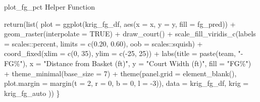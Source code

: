 \documentclass[
  9pt,
  ignorenonframetext,
  aspectratio=169]{beamer}
\newenvironment{Shaded}{\begin{snugshade}}{\end{snugshade}}
\newcommand{\AttributeTok}[1]{\textcolor[rgb]{0.00,0.34,0.68}{#1}}
\newcommand{\ConstantTok}[1]{\textcolor[rgb]{0.67,0.33,0.00}{#1}}
\newcommand{\DecValTok}[1]{\textcolor[rgb]{0.69,0.50,0.00}{#1}}
\newcommand{\FloatTok}[1]{\textcolor[rgb]{0.69,0.50,0.00}{#1}}
\newcommand{\FunctionTok}[1]{\textcolor[rgb]{0.39,0.29,0.61}{#1}}
\newcommand{\NormalTok}[1]{\textcolor[rgb]{0.12,0.11,0.11}{#1}}
\newcommand{\SpecialCharTok}[1]{\textcolor[rgb]{0.24,0.68,0.91}{#1}}
\newcommand{\StringTok}[1]{\textcolor[rgb]{0.75,0.01,0.01}{#1}}
\begin{document}
\begin{frame}[fragile]{plot\_fg\_pct Helper Function}
\begin{Shaded}
\begin{Highlighting}[]
  \FunctionTok{return}\NormalTok{(}\FunctionTok{list}\NormalTok{(}
    \AttributeTok{plot =} \FunctionTok{ggplot}\NormalTok{(krig\_fg\_df, }\FunctionTok{aes}\NormalTok{(}\AttributeTok{x =}\NormalTok{ x, }\AttributeTok{y =}\NormalTok{ y, }\AttributeTok{fill =}\NormalTok{ fg\_pred)) }\SpecialCharTok{+}
      \FunctionTok{geom\_raster}\NormalTok{(}\AttributeTok{interpolate =} \ConstantTok{TRUE}\NormalTok{) }\SpecialCharTok{+}
      \FunctionTok{draw\_court}\NormalTok{() }\SpecialCharTok{+}
      \FunctionTok{scale\_fill\_viridis\_c}\NormalTok{(}\AttributeTok{labels =}\NormalTok{ scales}\SpecialCharTok{::}\NormalTok{percent,}
                           \AttributeTok{limits =} \FunctionTok{c}\NormalTok{(}\FloatTok{0.20}\NormalTok{, }\FloatTok{0.60}\NormalTok{),}
                           \AttributeTok{oob =}\NormalTok{ scales}\SpecialCharTok{::}\NormalTok{squish) }\SpecialCharTok{+}
      \FunctionTok{coord\_fixed}\NormalTok{(}\AttributeTok{xlim =} \FunctionTok{c}\NormalTok{(}\DecValTok{0}\NormalTok{, }\DecValTok{35}\NormalTok{), }\AttributeTok{ylim =} \FunctionTok{c}\NormalTok{(}\SpecialCharTok{{-}}\DecValTok{25}\NormalTok{, }\DecValTok{25}\NormalTok{)) }\SpecialCharTok{+}
      \FunctionTok{labs}\NormalTok{(}\AttributeTok{title =} \FunctionTok{paste}\NormalTok{(team, }\StringTok{"{-} FG\%"}\NormalTok{),}
           \AttributeTok{x =} \StringTok{"Distance from Basket (ft)"}\NormalTok{,}
           \AttributeTok{y =} \StringTok{"Court Width (ft)"}\NormalTok{,}
           \AttributeTok{fill =} \StringTok{"FG\%"}\NormalTok{) }\SpecialCharTok{+}
      \FunctionTok{theme\_minimal}\NormalTok{(}\AttributeTok{base\_size =} \DecValTok{7}\NormalTok{) }\SpecialCharTok{+}
      \FunctionTok{theme}\NormalTok{(}\AttributeTok{panel.grid =} \FunctionTok{element\_blank}\NormalTok{(),}
            \AttributeTok{plot.margin =} \FunctionTok{margin}\NormalTok{(}\AttributeTok{t =} \DecValTok{2}\NormalTok{, }\AttributeTok{r =} \DecValTok{0}\NormalTok{, }\AttributeTok{b =} \DecValTok{0}\NormalTok{, }\AttributeTok{l =} \SpecialCharTok{{-}}\DecValTok{3}\NormalTok{)),}
    \AttributeTok{data =}\NormalTok{ krig\_fg\_df,}
    \AttributeTok{krig =}\NormalTok{ krig\_fg\_auto}
\NormalTok{  ))}
\NormalTok{\}}
\end{Highlighting}
\end{Shaded}
\end{frame}
\end{document}
